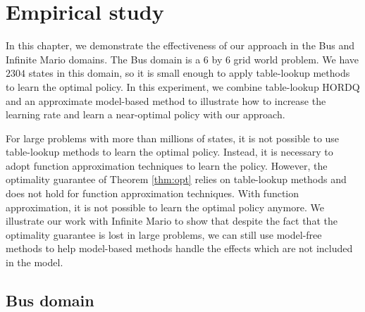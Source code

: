 
\chapter{Empirical study}

In this chapter, we demonstrate the effectiveness of our approach in the 
Bus and Infinite Mario domains.
The Bus domain is a 6 by 6 grid world problem. 
We have $2304$ states in this domain, so it is small enough to apply table-lookup methods to learn
the optimal policy. In this experiment, we combine table-lookup HORDQ and an approximate model-based method 
to illustrate how to increase the learning rate and learn a near-optimal policy with our approach.

For large problems with more than millions of states, it is not possible to use table-lookup methods to learn the optimal policy.
Instead, it is necessary to adopt function approximation techniques to learn the policy.
However, the optimality guarantee of Theorem \ref{thm:opt} relies on table-lookup methods and 
does not hold for function approximation techniques.
With function approximation, it is not possible to learn the optimal policy anymore.
We illustrate our work with Infinite Mario to show that despite the fact that the optimality guarantee is lost in
large problems, we can still use model-free methods to help model-based methods handle the effects which
are not included in the model. 



\section{Bus domain}
\label{se:domain}

